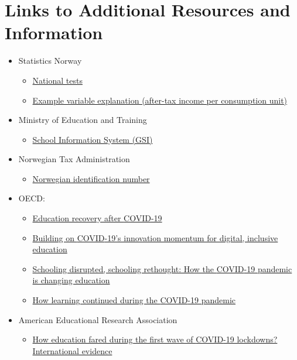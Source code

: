 \section{Links to Additional Resources and Information}

\begin{itemize}
    \item Statistics Norway
        \begin{itemize}
            \item \href{https://www.ssb.no/en/utdanning/grunnskoler/statistikk/nasjonale-prover}{National tests}
            \item \href{https://www.ssb.no/a/metadata/conceptvariable/vardok/3363/en}{Example variable explanation (after-tax income per consumption unit)}
        \end{itemize}
    \item Ministry of Education and Training
        \begin{itemize}
            \item \href{https://gsi.udir.no/}{School Information System (GSI)}
        \end{itemize}
    \item Norwegian Tax Administration
        \begin{itemize}
            \item \href{https://www.skatteetaten.no/en/person/foreign/norwegian-identification-number/}{Norwegian identification number}
        \end{itemize}
    \item OECD:
        \begin{itemize}
            \item \href{https://oecdedutoday.com/education-recovery-after-covid/}{Education recovery after {COVID}-19}
            \item \href{https://doi.org/10.1787/24202496-en}{Building on {COVID}-19's innovation momentum for digital, inclusive education}
            \item \href{https://read.oecd-ilibrary.org/view/?ref=133_133390-1rtuknc0hi&title=Schooling-disrupted-schooling-rethought-How-the-Covid-19-pandemic-is-changing-education}{Schooling disrupted, schooling rethought: How the {COVID}-19 pandemic is changing education}
            \item \href{https://doi.org/10.1787/bbeca162-en}{How learning continued during the {COVID}-19 pandemic}
        \end{itemize}
    \item American Educational Research Association
        \begin{itemize}
            \item \href{https://www.aera.net/Events-Meetings/How-Education-Fared-During-the-First-Wave-of-COVID-19-Lockdowns-International-Evidence}{How education fared during the first wave of {COVID}-19 lockdowns? International evidence}
        \end{itemize}
\end{itemize}
